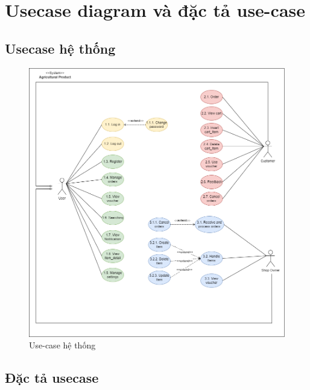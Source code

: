 \section{Usecase diagram và đặc tả use-case}
        \subsection{Usecase hệ thống}
            \begin{figure}[H]
                \centering
                \includegraphics[width=0.5\linewidth]{Images/usecase.png}
                \vspace{1em}
                \caption{Use-case hệ thống}
            \end{figure}
        \newpage
        \subsection{Đặc tả usecase}
